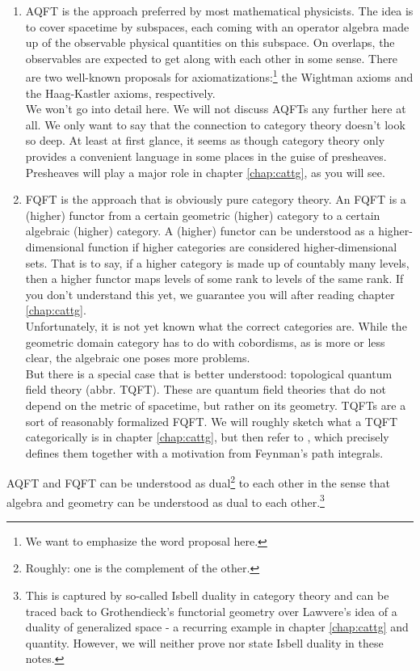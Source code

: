 \begin{enumerate}
\item[$\bullet$]
AQFT is the approach preferred by most mathematical physicists.
The idea is to cover spacetime by subspaces, each coming with an operator algebra made up of the observable physical quantities on this subspace.
On overlaps, the observables are expected to get along with each other in some sense.
There are two well-known proposals for axiomatizations:\footnote{We want to emphasize the word {\glqq}proposal{\grqq} here.} the Wightman axioms and the Haag-Kastler axioms, respectively.
\\
We won't go into detail here.
We will not discuss AQFTs any further here at all.
We only want to say that the connection to category theory doesn't look so deep.
At least at first glance, it seems as though category theory only provides a convenient language in some places in the guise of presheaves.
\\
Presheaves will play a major role in chapter \ref{chap:cattg}, as you will see.
\item[$\bullet$]
FQFT is the approach that is obviously pure category theory.
An FQFT is a (higher) {\glqq}functor{\grqq} from a certain geometric (higher) category to a certain algebraic (higher) category.
A (higher) functor can be understood as a higher-dimensional function if higher categories are considered higher-dimensional sets.
That is to say, if a higher category is made up of countably many levels, then a higher functor maps levels of some rank to levels of the same rank.
If you don't understand this yet, we guarantee you will after reading chapter \ref{chap:cattg}.
\\
Unfortunately, it is not yet known what the correct categories are.
While the geometric domain category has to do with cobordisms, as is more or less clear, the algebraic one poses more problems.
\\
But there is a special case that is better understood: topological quantum field theory (abbr. TQFT).
These are quantum field theories that do not depend on the metric of spacetime, but rather on its geometry.
TQFTs are a sort of reasonably formalized FQFT.
We will roughly sketch what a TQFT categorically is in chapter \ref{chap:cattg}, but then refer to \cite{00000011}, which precisely defines them together with a motivation from Feynman's path integrals.
\end{enumerate}
AQFT and FQFT can be understood as dual\footnote{Roughly: one is the complement of the other.} to each other in the sense that algebra and geometry can be understood as dual to each other.\footnote{This is captured by so-called Isbell duality in category theory and can be traced back to Grothendieck's functorial geometry over Lawvere's idea of a duality of generalized space - a recurring example in chapter \ref{chap:cattg} and quantity. However, we will neither prove nor state Isbell duality in these notes.}
